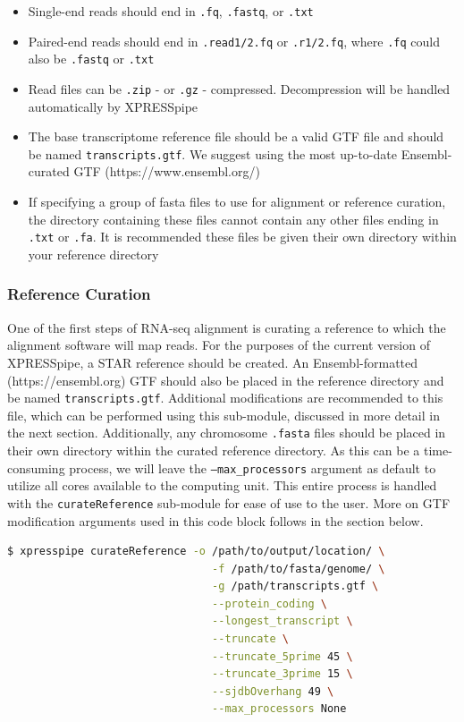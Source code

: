\documentclass[11pt, a4paper, oneside]{article}
\begin{document}
\begin{itemize}
\item Single-end reads should end in \texttt{.fq}, \texttt{.fastq}, or \texttt{.txt}
\item Paired-end reads should end in \texttt{.read1/2.fq} or \texttt{.r1/2.fq}, where \texttt{.fq} could also be \texttt{.fastq} or \texttt{.txt}
\item Read files can be \texttt{.zip} - or \texttt{.gz} - compressed. Decompression will be handled automatically by XPRESSpipe
\item The base transcriptome reference file should be a valid GTF file and should be named \texttt{transcripts.gtf}. We suggest using the most up-to-date Ensembl-curated GTF (https://www.ensembl.org/)
\item If specifying a group of fasta files to use for alignment or reference curation, the directory containing these files cannot contain any other files ending in \texttt{.txt} or \texttt{.fa}. It is recommended these files be given their own directory within your reference directory
\end{itemize}

\subsubsection{Reference Curation}
One of the first steps of RNA-seq alignment is curating a reference to which the alignment software will map reads. For the purposes of the current version of XPRESSpipe, a STAR \cite{star} reference should be created. An Ensembl-formatted (https://ensembl.org) GTF should also be placed in the reference directory and be named \texttt{transcripts.gtf}. Additional modifications are recommended to this file, which can be performed using this sub-module, discussed in more detail in the next section. Additionally, any chromosome \texttt{.fasta} files should be placed in their own directory within the curated reference directory. As this can be a time-consuming process, we will leave the \texttt{--max\_processors} argument as default to utilize all cores available to the computing unit. This entire process is handled with the \texttt{curateReference} sub-module for ease of use to the user. More on GTF modification arguments used in this code block follows in the section below.
\newline
\begin{lstlisting}[language=bash, caption=curateReference example]
$ xpresspipe curateReference -o /path/to/output/location/ \
                                -f /path/to/fasta/genome/ \
                                -g /path/transcripts.gtf \
                                --protein_coding \
                                --longest_transcript \
                                --truncate \
                                --truncate_5prime 45 \
                                --truncate_3prime 15 \
                                --sjdbOverhang 49 \
                                --max_processors None
\end{lstlisting}
\end{document}
